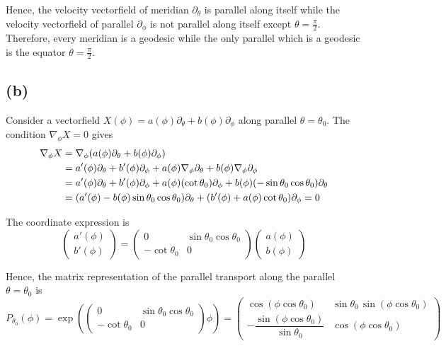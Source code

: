 \documentclass[a4paper,11pt]{article}
\begin{document}
Hence, the velocity vectorfield of meridian $\partial_\theta$ is parallel along itself while the velocity vectorfield of parallel $\partial_\phi$ is not parallel along itself except $\theta = \frac{\pi}{2}$. Therefore, every meridian is a geodesic while the only parallel which is a geodesic is the equator $\theta = \frac{\pi}{2}$.

\subsection{(b)}

Consider a vectorfield $X(\phi) = a(\phi)\partial_\theta + b(\phi)\partial_\phi$ along parallel $\theta = \theta_0$. The condition $\nabla_\phi X=0$ gives
\begin{align}
    \nabla_\phi X &= \nabla_\phi (a(\phi)\partial_\theta + b(\phi)\partial_\phi)\notag\\
    &= a'(\phi)\partial_\theta + b'(\phi)\partial_\phi + a(\phi)\nabla_\phi\partial_\theta + b(\phi)\nabla_\phi\partial_\phi\notag\\
    &= a'(\phi)\partial_\theta + b'(\phi)\partial_\phi + a(\phi)(\cot\theta_0)\partial_\phi + b(\phi)(-\sin\theta_0\cos\theta_0)\partial_\theta\notag\\
    &= (a'(\phi) - b(\phi)\sin\theta_0\cos\theta_0)\partial_\theta + (b'(\phi) + a(\phi)\cot\theta_0)\partial_\phi =0
\end{align}

The coordinate expression is
\begin{equation}
    \begin{pmatrix}
        a'(\phi)\\
        b'(\phi)
    \end{pmatrix}
    = \begin{pmatrix}
        0 & \sin\theta_0\cos\theta_0\\
        -\cot\theta_0 & 0
    \end{pmatrix}
    \begin{pmatrix}
        a(\phi)\\
        b(\phi)
    \end{pmatrix}
\end{equation}

Hence, the matrix representation of the parallel transport along the parallel $\theta = \theta_0$ is
\begin{equation}
    P_{\theta_0}(\phi) = \exp\left(\begin{pmatrix}
        0 & \sin\theta_0\cos\theta_0\\
        -\cot\theta_0 & 0
    \end{pmatrix}\phi\right)
    = \begin{pmatrix}
        \cos(\phi\cos\theta_0) & \sin\theta_0\,\sin(\phi\cos\theta_0)\\
        -\dfrac{\sin(\phi\cos\theta_0)}{\sin\theta_0} & \cos(\phi\cos\theta_0)
    \end{pmatrix}
\end{equation}
\end{document}
